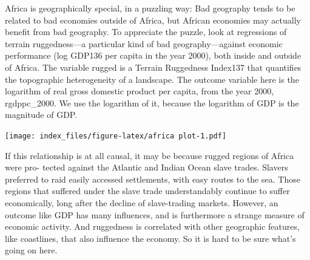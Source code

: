 \documentclass[
]{article}
\newenvironment{Shaded}{\begin{snugshade}}{\end{snugshade}}
\newcommand{\CommentTok}[1]{\textcolor[rgb]{0.56,0.35,0.01}{\textit{#1}}}
\newcommand{\DataTypeTok}[1]{\textcolor[rgb]{0.13,0.29,0.53}{#1}}
\newcommand{\DecValTok}[1]{\textcolor[rgb]{0.00,0.00,0.81}{#1}}
\newcommand{\KeywordTok}[1]{\textcolor[rgb]{0.13,0.29,0.53}{\textbf{#1}}}
\newcommand{\NormalTok}[1]{#1}
\newcommand{\OperatorTok}[1]{\textcolor[rgb]{0.81,0.36,0.00}{\textbf{#1}}}
\newcommand{\StringTok}[1]{\textcolor[rgb]{0.31,0.60,0.02}{#1}}
\begin{document}
Africa is geographically special, in a puzzling way: Bad geography tends
to be related to bad economies outside of Africa, but African economies
may actually benefit from bad geography. To appreciate the puzzle, look
at regressions of terrain ruggedness---a particular kind of bad
geography---against economic performance (log GDP136 per capita in the
year 2000), both inside and outside of Africa. The variable rugged is a
Terrain Ruggedness Index137 that quantifies the topographic
heterogeneity of a landscape. The outcome variable here is the logarithm
of real gross domestic product per capita, from the year 2000,
rgdppc\_2000. We use the logarithm of it, because the logarithm of GDP
is the magnitude of GDP.

\begin{Shaded}
\end{Shaded}

\texttt{[image: index\_files/figure-latex/africa plot-1.pdf]}

If this relationship is at all causal, it may be because rugged regions
of Africa were pro- tected against the Atlantic and Indian Ocean slave
trades. Slavers preferred to raid easily accessed settlements, with easy
routes to the sea. Those regions that suffered under the slave trade
understandably continue to suffer economically, long after the decline
of slave-trading markets. However, an outcome like GDP has many
influences, and is furthermore a strange measure of economic activity.
And ruggedness is correlated with other geographic features, like
coastlines, that also influence the economy. So it is hard to be sure
what's going on here.
\end{document}
